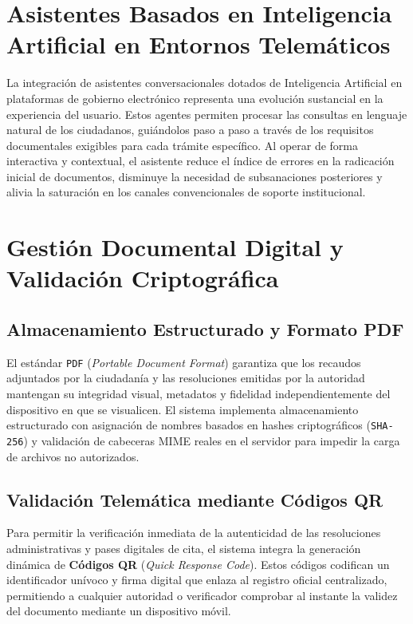 \section{Asistentes Basados en Inteligencia Artificial en Entornos Telemáticos}

La integración de asistentes conversacionales dotados de Inteligencia Artificial en plataformas de gobierno electrónico representa una evolución sustancial en la experiencia del usuario. Estos agentes permiten procesar las consultas en lenguaje natural de los ciudadanos, guiándolos paso a paso a través de los requisitos documentales exigibles para cada trámite específico. Al operar de forma interactiva y contextual, el asistente reduce el índice de errores en la radicación inicial de documentos, disminuye la necesidad de subsanaciones posteriores y alivia la saturación en los canales convencionales de soporte institucional.

\section{Gestión Documental Digital y Validación Criptográfica}

\subsection{Almacenamiento Estructurado y Formato PDF}
El estándar \texttt{PDF} (\textit{Portable Document Format}) garantiza que los recaudos adjuntados por la ciudadanía y las resoluciones emitidas por la autoridad mantengan su integridad visual, metadatos y fidelidad independientemente del dispositivo en que se visualicen. El sistema implementa almacenamiento estructurado con asignación de nombres basados en hashes criptográficos (\texttt{SHA-256}) y validación de cabeceras MIME reales en el servidor para impedir la carga de archivos no autorizados.

\subsection{Validación Telemática mediante Códigos QR}
Para permitir la verificación inmediata de la autenticidad de las resoluciones administrativas y pases digitales de cita, el sistema integra la generación dinámica de \textbf{Códigos QR} (\textit{Quick Response Code}). Estos códigos codifican un identificador unívoco y firma digital que enlaza al registro oficial centralizado, permitiendo a cualquier autoridad o verificador comprobar al instante la validez del documento mediante un dispositivo móvil.
